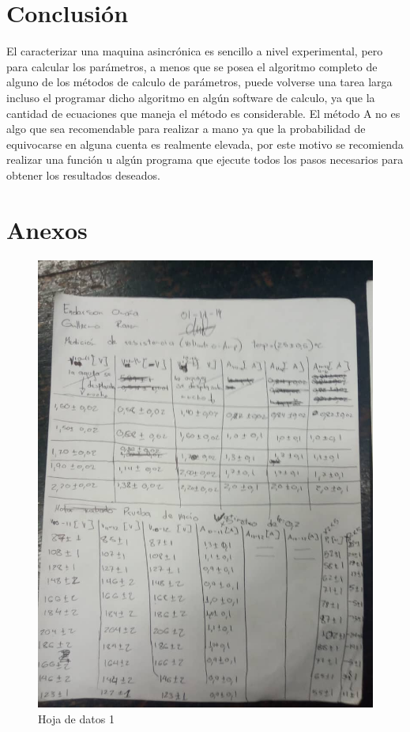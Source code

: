 \documentclass[11pt,letterpaper]{article}     %
\begin{document}
\section{Conclusión}
El caracterizar una maquina asincrónica es sencillo a nivel experimental, pero para calcular los parámetros, a menos que se posea el algoritmo completo de alguno de los métodos de calculo de parámetros, puede volverse una tarea larga incluso el programar dicho algoritmo en algún software de calculo, ya que la cantidad de ecuaciones que maneja el método es considerable. El método A no es algo que sea recomendable para realizar a mano ya que la probabilidad de equivocarse en alguna cuenta es realmente elevada, por este motivo se recomienda realizar una función u algún programa que ejecute todos los pasos necesarios para obtener los resultados deseados.
\newpage
\section{Anexos}
\begin{figure}[H]
	\centering
	\includegraphics[scale=0.55]{./recursos-Lab8/HojaDeDatos1.jpeg}
	\caption{Hoja de datos 1}
\end{figure}
\end{document}
